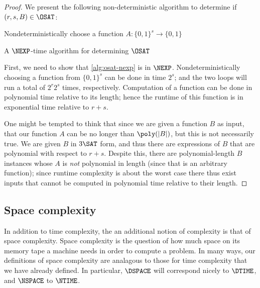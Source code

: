\documentclass[english,12pt]{reedthesis}
\theoremstyle{plain}
\theoremstyle{definition}
\theoremstyle{remark}
\DeclarePairedDelimiter{\abs}{\lvert}{\rvert}
\begin{document}
\begin{proof}
  We present the following non-deterministic algorithm to determine if
  $(r, s, B) \in \OSAT$:

  \begin{algorithm}[H]
    Nondeterministically choose a function $A: \{0, 1\}^{s} \rightarrow \{0, 1\}$\;
    \;
    \caption{A $\NEXP$-time algorithm for determining $\OSAT$}\label{alg:osat-nexp}
  \end{algorithm}

  First, we need to show that \cref{alg:osat-nexp} is in $\NEXP$.
  Nondeterministically choosing a function from $\{0, 1\}^{s}$ can be done in
  time $2^{s}$; and the two loops will run a total of $2^{r}2^{s}$ times,
  respectively. Computation of a function can be done in polynomial time
  relative to its length; hence the runtime of this function is in exponential
  time relative to $r + s$.

  One might be tempted to think that since we are given a function $B$ as input,
  that our function $A$ can be no longer than $\poly(\abs{B})$, but this is not
  necessarily true. We are given $B$ in $3\SAT$ form, and thus there are
  expressions of $B$ that are polynomial with respect to $r + s$. Despite this,
  there are polynomial-length $B$ instances whose $A$ is \emph{not} polynomial
  in length (since that is an arbitrary function); since runtime complexity is
  about the worst case there thus exist inputs that cannot be computed in
  polynomial time relative to their length.
\end{proof}

\subsection{Space complexity}

In addition to time complexity, the an additional notion of complexity is that
of space complexity. Space complexity is the question of how much space on its
memory tape a machine needs in order to compute a problem. In many ways, our
definitions of space complexity are analagous to those for time complexity that
we have already defined. In particular, $\DSPACE$ will correspond nicely to
$\DTIME$, and $\NSPACE$ to $\NTIME$.
\end{document}
